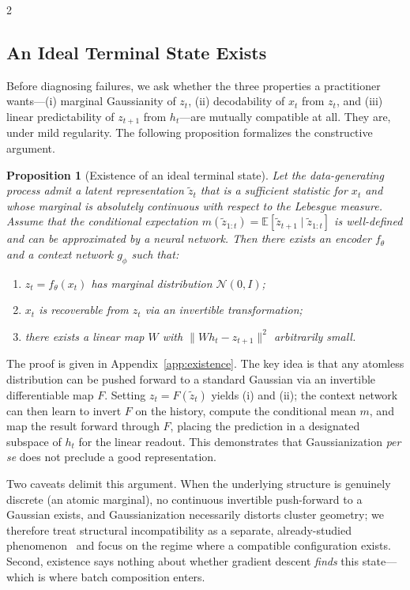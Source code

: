 \documentclass[10pt]{article}
\newtheorem{proposition}{Proposition}
\theoremstyle{remark}
\begin{document}
\begin{multicols*}{2}
\subsection{An Ideal Terminal State Exists}

Before diagnosing failures, we ask whether the three properties a practitioner wants---(i) marginal Gaussianity of $z_t$, (ii) decodability of $x_t$ from $z_t$, and (iii) linear predictability of $z_{t+1}$ from $h_t$---are mutually compatible at all. They are, under mild regularity. The following proposition formalizes the constructive argument.

\begin{proposition}[Existence of an ideal terminal state]
\label{prop:ideal}
Let the data-generating process admit a latent representation $\tilde{z}_t$ that is a sufficient statistic for $x_t$ and whose marginal is absolutely continuous with respect to the Lebesgue measure. Assume that the conditional expectation $m(\tilde{z}_{1:t}) = \mathbb{E}[\tilde{z}_{t+1} \mid \tilde{z}_{1:t}]$ is well-defined and can be approximated by a neural network. Then there exists an encoder $f_\theta$ and a context network $g_\phi$ such that:
\begin{enumerate}[leftmargin=*]
    \item $z_t = f_\theta(x_t)$ has marginal distribution $\mathcal{N}(0,I)$;
    \item $x_t$ is recoverable from $z_t$ via an invertible transformation;
    \item there exists a linear map $W$ with $\|W h_t - z_{t+1}\|^2$ arbitrarily small.
\end{enumerate}
\end{proposition}

The proof is given in Appendix~\ref{app:existence}. The key idea is that any atomless distribution can be pushed forward to a standard Gaussian via an invertible differentiable map $F$. Setting $z_t = F(\tilde{z}_t)$ yields (i) and (ii); the context network can then learn to invert $F$ on the history, compute the conditional mean $m$, and map the result forward through $F$, placing the prediction in a designated subspace of $h_t$ for the linear readout. This demonstrates that Gaussianization \emph{per se} does not preclude a good representation.

Two caveats delimit this argument. When the underlying structure is genuinely discrete (an atomic marginal), no continuous invertible push-forward to a Gaussian exists, and Gaussianization necessarily distorts cluster geometry; we therefore treat structural incompatibility as a separate, already-studied phenomenon~\cite{klindt2026lejepa,liu2026tclwm} and focus on the regime where a compatible configuration exists. Second, existence says nothing about whether gradient descent \emph{finds} this state---which is where batch composition enters.


\end{multicols*}
\end{document}
